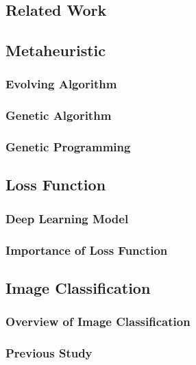 \begin{ZhChapter}

\chapter{Related Work}

\section{Metaheuristic}

\subsection{Evolving Algorithm}

\subsection{Genetic Algorithm}

\subsection{Genetic Programming}
\section{Loss Function}

\subsection{Deep Learning Model}

\subsection{Importance of Loss Function}

\section{Image Classification}

\subsection{Overview of Image Classification}

\subsection{Previous Study}


\end{ZhChapter}
